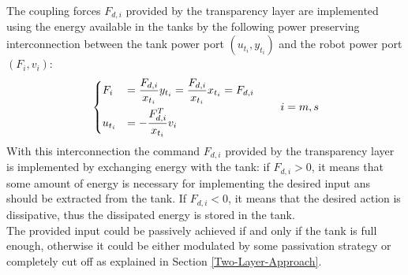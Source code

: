 The coupling forces $F_{d,i} $ provided by the transparency layer are implemented using the energy available in the tanks by the following power preserving interconnection between the tank power port $(u_{t_{i}}, y_{t_i})$ and the robot power port $(F_{i}, v_{i})$:
\begin{equation}\label{robot-tank_interconnection}
	\left. 
	\begin{dcases}
		F_{i} &= \dfrac{F_{d,i}}{x_{t_{i}}}y_{t_{i}} = \dfrac{F_{d,i}}{x_{t_{i}}}x_{t_{i}} =F_{d,i}\\
		u_{t_{i}} &= -\dfrac{F^{T}_{d,i}}{x_{t_{i}}}v_{i} 
	\end{dcases}
	\right. \qquad i=m,s
\end{equation}
With this interconnection the command  $F_{d,i} $ provided by the transparency layer is implemented by exchanging energy with the tank: if $F_{d,i} >0$, it means that some amount of energy is necessary for implementing the desired input ans should be extracted from the tank. If $F_{d,i} <0 $, it means that the desired action is dissipative, thus the dissipated energy is stored in the tank.\\
The provided input could be passively achieved if and only if the tank is full enough, otherwise it could be either modulated by some passivation strategy or completely  cut off as explained in Section \ref{Two-Layer-Approach}.

